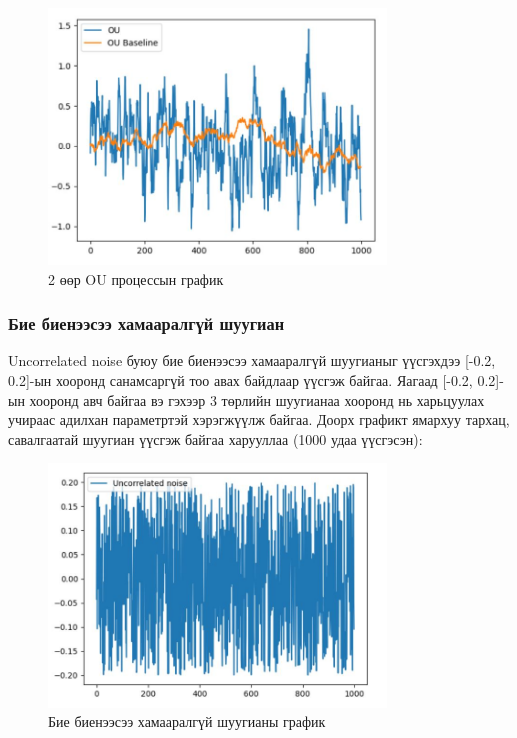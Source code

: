 \documentclass[12pt,A4]{report}
\begin{document}
\begin{figure}[H]
\centering
\includegraphics[width=0.8\textwidth]{./images/OU_OUBaseline_Graph}
\caption{2 өөр OU процессын график}
\end{figure}

\subsubsection{Бие биенээсээ хамааралгүй шуугиан}

Uncorrelated noise буюу бие биенээсээ хамааралгүй шуугианыг үүсгэхдээ [-0.2, 0.2]-ын хооронд санамсаргүй тоо авах байдлаар үүсгэж байгаа. Яагаад [-0.2, 0.2]-ын хооронд авч байгаа вэ гэхээр 3 төрлийн шуугианаа хооронд нь харьцуулах учираас адилхан параметртэй хэрэгжүүлж байгаа. Доорх графикт ямархуу тархац, савалгаатай шуугиан үүсгэж байгаа харууллаа (1000 удаа үүсгэсэн):

\begin{figure}[H]
\centering
\includegraphics[width=0.8\textwidth]{./images/Uncorrelated_noise}
\caption{Бие биенээсээ хамааралгүй шуугианы график}
\end{figure}
\end{document}
